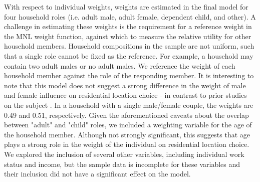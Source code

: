 With respect to individual weights, weights are estimated in the final model for four household roles (i.e. adult male, adult female, dependent child, and other). A challenge in estimating these weights is the requirement for a reference weight in the MNL weight function, against which to measure the relative utility for other household members. Household compositions in the sample are not uniform, such that a single role cannot be fixed as the reference. For example, a household may contain two adult males or no adult males. We reference the weight of each household member against the role of the responding member. It is interesting to note that this model does not suggest a strong difference in the weight of male and female influence on residential location choice - in contrast to prior studies on the subject \cite{Chiappori2014, Picard2013}. In a household with a single male/female couple, the weights are 0.49 and 0.51, respectively. Given the aforementioned caveats about the overlap between "adult" and "child" roles, we included a weighting variable for the age of the household member. Although not strongly significant, this suggests that age plays a strong role in the weight of the individual on residential location choice. We explored the inclusion of several other variables, including individual work status and income, but the sample data is incomplete for these variables and their inclusion did not have a significant effect on the model.

